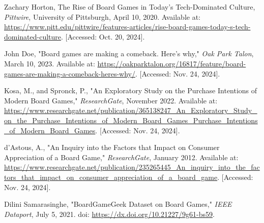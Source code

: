 \documentclass{article}
\begin{document}

\begin{thebibliography}{9}

Zachary Horton, The Rise of Board Games in Today’s Tech-Dominated Culture, \textit{Pittwire}, University of Pittsburgh, April 10, 2020. Available at: \href{https://www.pitt.edu/pittwire/features-articles/rise-board-games-today-s-tech-dominated-culture}{https://www.pitt.edu/pittwire/features-articles/rise-board-games-today-s-tech-dominated-culture}. [Accessed: Oct. 20, 2024].

John Doe, "Board games are making a comeback. Here's why," \textit{Oak Park Talon}, March 10, 2023. Available at: \url{https://oakparktalon.org/16817/feature/board-games-are-making-a-comeback-heres-why/}. [Accessed: Nov. 24, 2024].

Kosa, M., and Spronck, P., "An Exploratory Study on the Purchase Intentions of Modern Board Games," \textit{ResearchGate}, November 2022. Available at: \url{https://www.researchgate.net/publication/365138247_An_Exploratory_Study_on_the_Purchase_Intentions_of_Modern_Board_Games_Purchase_Intentions_of_Modern_Board_Games}. [Accessed: Nov. 24, 2024].

d'Astous, A., "An Inquiry into the Factors that Impact on Consumer Appreciation of a Board Game," \textit{ResearchGate}, January 2012. Available at: \url{https://www.researchgate.net/publication/235265445_An_inquiry_into_the_factors_that_impact_on_consumer_appreciation_of_a_board_game}. [Accessed: Nov. 24, 2024].

Dilini Samarasinghe, "BoardGameGeek Dataset on Board Games," \textit{IEEE Dataport}, July 5, 2021. doi: \href{https://dx.doi.org/10.21227/9g61-bs59}{https://dx.doi.org/10.21227/9g61-bs59}.

\end{thebibliography}
\end{document}
